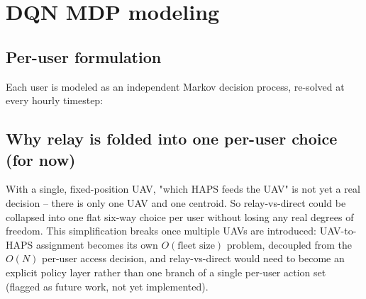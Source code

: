 \documentclass[11pt]{article}
\begin{document}
\section{DQN MDP modeling}

\subsection{Per-user formulation}
Each user is modeled as an independent Markov decision process, re-solved at every
hourly timestep:

\begin{center}
\end{center}

\subsection{Why relay is folded into one per-user choice (for now)}
With a single, fixed-position UAV, "which HAPS feeds the UAV" is not yet a real decision
-- there is only one UAV and one centroid. So relay-vs-direct could be collapsed into one
flat six-way choice per user without losing any real degrees of freedom. This
simplification breaks once multiple UAVs are introduced: UAV-to-HAPS assignment becomes
its own $O(\text{fleet size})$ problem, decoupled from the $O(N)$ per-user access
decision, and relay-vs-direct would need to become an explicit policy layer rather than
one branch of a single per-user action set (flagged as future work, not yet implemented).
\end{document}
